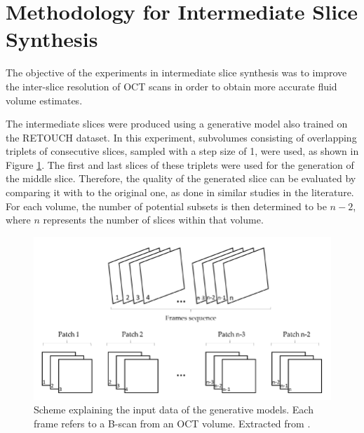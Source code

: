 \section{Methodology for Intermediate Slice Synthesis}
The objective of the experiments in intermediate slice synthesis was to improve the inter-slice resolution of OCT scans in order to obtain more accurate fluid volume estimates.
\par
The intermediate slices were produced using a generative model also trained on the RETOUCH dataset. In this experiment, subvolumes consisting of overlapping triplets of consecutive slices, sampled with a step size of 1, were used, as shown in Figure \ref{fig:FrameInterpolationFramework}. The first and last slices of these triplets were used for the generation of the middle slice. Therefore, the quality of the generated slice can be evaluated by comparing it with to the original one, as done in similar studies in the literature. For each volume, the number of potential subsets is then determined to be $n-2$, where $n$ represents the number of slices within that volume.

\begin{figure}[!ht]
	\centering
	\includegraphics[width=1.0\linewidth]{figures/FrameInterpolationFramework.png}
	\caption{Scheme explaining the input data of the generative models. Each frame refers to a B-scan from an OCT volume. Extracted from \textcite{Tran2020}.}
	\label{fig:FrameInterpolationFramework}
\end{figure}

